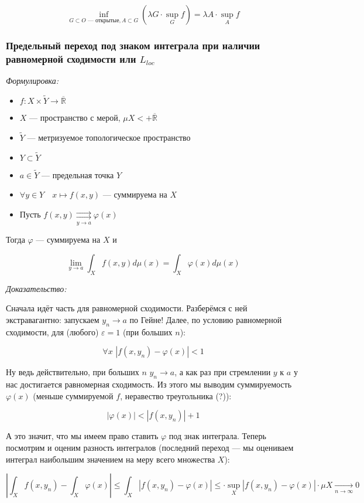 \documentclass{article}
\def\dbl{\,\,}
\def\rsh#1{\underset{#1}{\rightrightarrows}}
\def\rinf{\overline{\mathbb{R}}}
\def\goesto#1{\underset{#1}{\longrightarrow}}
\def\toinf#1{\goesto{#1 \rightarrow \infty}}
\def\ntoinf{\toinf{n}}
\begin{document}
\[\inf_{G \subset O\text{ --- открытые}, A \subset G} \left(\lambda G \cdot \sup_{G}f\right) = \lambda A \cdot \sup_{A} f  \]

\subsubsection{Предельный переход под знаком интеграла при наличии равномерной сходимости или $L_{loc}$}
\textit{Формулировка:}

\begin{itemize}
    \item $f: X \times \tilde{Y} \rightarrow \rinf$
    \item $X$ --- пространство с мерой, $\mu X < + \rinf$
    \item $\tilde{Y}$ --- метризуемое топологическое пространство
    \item $Y \subset \tilde{Y}$
    \item $a \in \tilde{Y}$ --- предельная точка  $Y$
    \item $\forall y \in Y \quad x \mapsto f(x, y)$ --- суммируема на $X$
    \item Пусть $f(x, y) \rsh{y \rightarrow a} \varphi(x)$
\end{itemize}

Тогда $\varphi$ --- суммируема на $X$ и 

\[\lim_{y \rightarrow a} \int_{X} f(x, y) d \mu(x) = \int_{X} \varphi(x) d \mu(x)\]
 
\textit{Доказательство:}

Сначала идёт часть для равномерной сходимости. Разберёмся с ней экстравагантно: запускаем $y_n \rightarrow a$ по Гейне! Далее, по условию равномерной сходимости, для (любого) $\varepsilon = 1$ (при больших $n$):

\[\forall x \dbl |f(x, y_n) - \varphi(x)| < 1\]

Ну ведь действительно, при больших $n \dbl y_n \rightarrow a$, а как раз при стремлении $y$ к $a$ у нас достигается равномерная сходимость. Из этого мы выводим суммируемость $\varphi(x)$ (меньше суммируемой $f$, неравество треугольника (?)):

\[|\varphi(x)| < |f(x, y_n)| + 1\]

А это значит, что мы имеем право ставить $\varphi$ под знак интеграла. Теперь посмотрим и оценим разность интегралов (последний переход --- мы оцениваем интеграл наибольшим значением на меру всего множества $X$):

\[\left| \int_{X} f(x, y_n) - \int_{X} \varphi(x)\right| \le \int_{X} |f(x, y_n) - \varphi(x)| \le \cdot \sup_{X} |f(x, y_n) - \varphi(x)| \cdot \mu X \ntoinf 0\]
\end{document}
